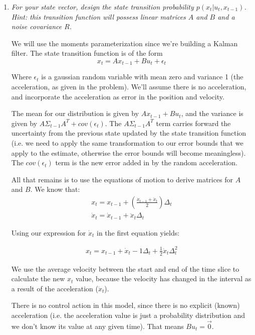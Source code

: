 \documentclass[10pt]{article}
\begin{document}
\begin{enumerate}
\begin{enumerate}
  \item \textit{For your state vector, design the state transition probability 
    $p(x_t | u_t,x_{t-1})$. Hint: this transition function will possess linear
  matrices $A$ and $B$ and a noise covariance $R$.}

  We will use the moments parameterization since we're building a Kalman filter.
  The state transition function is of the form
  $$x_t = A x_{t-1} + B u_t + \epsilon_t$$

  Where $\epsilon_t$ is a gaussian random variable with mean zero and variance 1
  (the acceleration, as given in the problem). We'll assume there is no
  acceleration, and incorporate the acceleration as error in the position and
  velocity.
 
  The mean for our distribution is given by $A x_{t-1} + B u_t$, and the
  variance is given by $A\Sigma_{t-1}A^T + cov(\epsilon_t)$. The
  $A\Sigma_{t-1}A^T$ term carries forward the uncertainty from the previous state
  updated by the state transition function (i.e. we need to apply the same
  transformation to our error bounds that we apply to the estimate, otherwise
  the error bounds will become meaningless). The $cov(\epsilon_t)$ term is the
  new error added in by the random acceleration.

  All that remains is to use the equations of motion to derive matrices for $A$
  and $B$. We know that:
  \begin{gather}
    x_t = x_{t-1} + \left(\frac{\dot{x}_{t-1}+\dot{x}_t}{2}\right) \Delta_t \\ 
    \dot{x}_t = \dot{x}_{t-1} + \ddot{x}_t\Delta_t 
  \end{gather}

  Using our expression for $\dot{x}_t$ in the first equation yields:

  \begin{gather}
  x_t = x_{t-1} + \dot{x}_t-1\Delta_t + \frac{1}{2}\ddot{x}_t\Delta_t^2
  \end{gather}

  We use the average velocity between the start and end of the time slice to
  calculate the new $x_t$ value, because the velocity has changed in the
  interval as a result of the acceleration ($\ddot{x}_{t}$).

  There is no control action in this model, since there is no explicit (known)
  acceleration (i.e. the acceleration value is just a probability distribution
  and we don't know its value at any given time). That means $B u_t = \vec{0}$.


\end{enumerate}
\end{enumerate}
\end{document}
